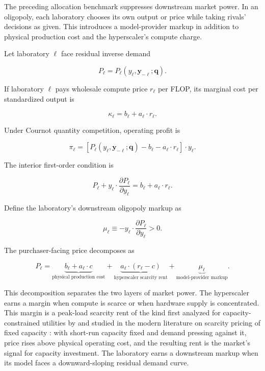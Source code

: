 \documentclass[11pt]{article}
\begin{document}
The preceding allocation benchmark suppresses downstream market power. In an oligopoly, each laboratory chooses its own output or price while taking rivals' decisions as given. This introduces a model-provider markup in addition to physical production cost and the hyperscaler's compute charge.

Let laboratory $\ell$ face residual inverse demand

\begin{equation}P_\ell=P_\ell(y_\ell,\mathbf y_{-\ell};\mathbf q).\end{equation}

If laboratory $\ell$ pays wholesale compute price $r_\ell$ per FLOP, its marginal cost per standardized output is

\begin{equation}\kappa_\ell=b_\ell+a_\ell\cdot r_\ell.\end{equation}

Under Cournot quantity competition, operating profit is

\begin{equation}\pi_\ell=\left[P_\ell(y_\ell,\mathbf y_{-\ell};\mathbf q)-b_\ell-a_\ell\cdot r_\ell\right]\cdot y_\ell.\end{equation}

The interior first-order condition is

\begin{equation}P_\ell+y_\ell\cdot\frac{\partial P_\ell}{\partial y_\ell}=b_\ell+a_\ell\cdot r_\ell.\end{equation}

Define the laboratory's downstream oligopoly markup as

\begin{equation}\mu_\ell\equiv-y_\ell\cdot\frac{\partial P_\ell}{\partial y_\ell}>0.\end{equation}

The purchaser-facing price decomposes as

\begin{equation}\boxed{P_\ell=\underbrace{b_\ell+a_\ell\cdot c}_{\text{physical production cost}}+\underbrace{a_\ell\cdot(r_\ell-c)}_{\text{hyperscaler scarcity rent}}+\underbrace{\mu_\ell}_{\text{model-provider markup}}.}\end{equation}

This decomposition separates the two layers of market power. The hyperscaler earns a margin when compute is scarce or when hardware supply is concentrated. This margin is a peak-load scarcity rent of the kind first analyzed for capacity-constrained utilities by \citet{boiteux1960} and studied in the modern literature on scarcity pricing of fixed capacity \citep{crewKleindorfer1976}: with short-run capacity fixed and demand pressing against it, price rises above physical operating cost, and the resulting rent is the market's signal for capacity investment. The laboratory earns a downstream markup when its model faces a downward-sloping residual demand curve.
\end{document}
